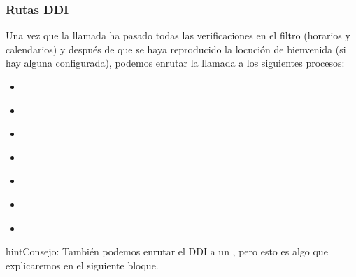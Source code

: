 \documentclass[letterpaper,10pt,spanish]{sphinxmanual}
\begin{document}
\subsubsection{Rutas DDI}
\label{administration_portal/client/vpbx/ddis:routing-logics}\label{administration_portal/client/vpbx/ddis:ddi-routes}
Una vez que la llamada ha pasado todas las verificaciones en el filtro (horarios y calendarios) y después de que se haya reproducido la locución de bienvenida (si hay alguna configurada), podemos enrutar la llamada a los siguientes procesos:
\begin{itemize}
\item {} 
{\hyperref[administration_portal/client/vpbx/users:users]{}}

\item {} 
{\hyperref[administration_portal/client/vpbx/routing_endpoints/hunt_groups:huntgroups]{}}

\item {} 
{\hyperref[administration_portal/client/vpbx/routing_endpoints/ivrs:ivrs]{}}

\item {} 
{\hyperref[administration_portal/client/vpbx/routing_endpoints/conference_rooms:conference\string-rooms]{}}

\item {} 
{\hyperref[administration_portal/client/vpbx/routing_endpoints/conditional_routes:conditional\string-routes]{}}

\item {} 
{\hyperref[administration_portal/client/vpbx/routing_endpoints/queues:queues]{}}

\item {} 
{\hyperref[administration_portal/client/vpbx/routing_endpoints/friends/index:friends]{}}

\end{itemize}

\begin{notice}{hint}{Consejo:}
También podemos enrutar el DDI a un {\hyperref[administration_portal/client/vpbx/faxes:faxing\string-system]{}}, pero esto es algo que explicaremos en el siguiente bloque.
\end{notice}
\end{document}
